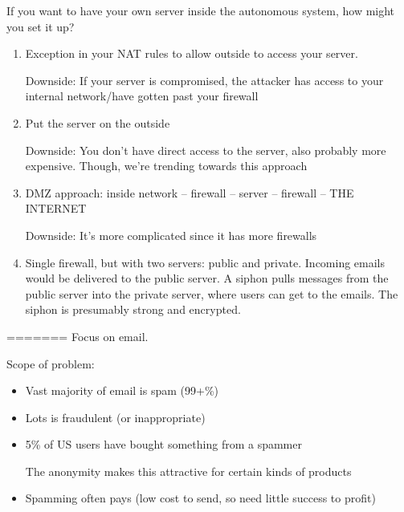 
If you want to have your own server inside the autonomous system, how might you set it up?
\begin{enumerate}	
	\item Exception in your NAT rules to allow outside to access your server.

		Downside: If your server is compromised, the attacker has access to your internal network/have gotten past your firewall
	\item Put the server on the outside

		Downside: You don't have direct access to the server, also probably more expensive. Though, we're trending towards this approach
	\item DMZ approach: inside network -- firewall -- server -- firewall -- THE INTERNET

		Downside: It's more complicated since it has more firewalls
	\item Single firewall, but with two servers: public and private. Incoming emails would be delivered to the public server. A siphon pulls messages from the public server into the private server, where users can get to the emails. The siphon is presumably strong and encrypted.
\end{enumerate}
=======
Focus on email.

Scope of problem:
\begin{itemize}
    \item Vast majority of email is spam (99+\%)
    \item Lots is fraudulent (or inappropriate)
    \item 5\% of US users have bought something from a spammer

        The anonymity makes this attractive for certain kinds of products
    \item Spamming often pays (low cost to send, so need little success to
            profit)
\end{itemize}

